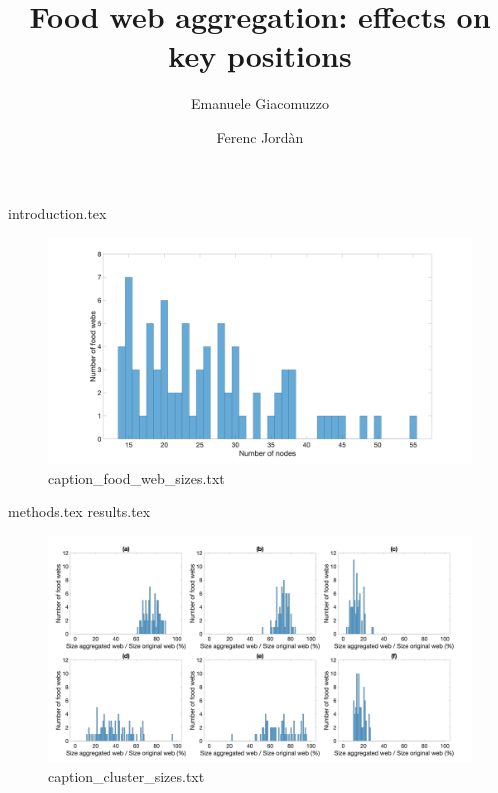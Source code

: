 \documentclass[onecolumn]{article} %
\title{Food web aggregation: effects on key positions}
\author[1]{Emanuele Giacomuzzo}
\author[1]{Ferenc Jordàn}
\affil[1]{Stazione Zoologica Anton Dohrn, Napoli, 80122, Italy}
\date{}
\begin{document}
\maketitle

{introduction.tex}

						\begin{figure}[htbp]%
							\centering
							\includegraphics[width=1.0\linewidth]{food_web_sizes.png}
							\caption{ {caption_food_web_sizes.txt} }
							\label{fig:equivalences}
						\end{figure} %

{methods.tex}
{results.tex}

						\begin{figure}[htbp]%
							\centering
							\includegraphics[width=1.0\linewidth]{cluster_sizes.png}
							\caption{ {caption_cluster_sizes.txt} }
							\label{fig:equivalences}
						\end{figure} %
\end{document}
